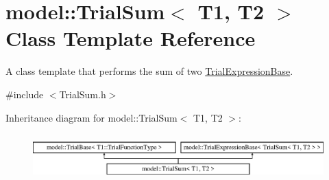 \hypertarget{classmodel_1_1_trial_sum}{}\section{model\+:\+:Trial\+Sum$<$ T1, T2 $>$ Class Template Reference}
\label{classmodel_1_1_trial_sum}


A class template that performs the sum of two \hyperlink{structmodel_1_1_trial_expression_base}{Trial\+Expression\+Base}.  




{\ttfamily \#include $<$Trial\+Sum.\+h$>$}

Inheritance diagram for model\+:\+:Trial\+Sum$<$ T1, T2 $>$\+:\begin{figure}[H]
\begin{center}
\leavevmode
\includegraphics[height=1.818182cm]{classmodel_1_1_trial_sum}
\end{center}
\end{figure}
